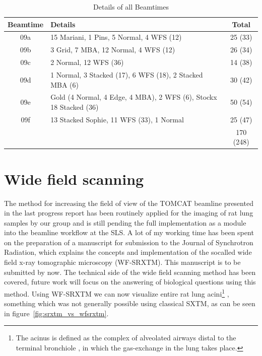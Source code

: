 \documentclass[a4paper,twoside,english,DIV=calc]{scrartcl}
\begin{document}
\begin{table}[htp]
\centering
\scriptsize
\begin{tabular}{clc}
\toprule
Beamtime & Details & Total\\
\midrule
09a & 15 Mariani, 1 Pins, 5 Normal, 4 WFS (12) & 25 (33)\\
09b & 3 Grid, 7 MBA, 12 Normal, 4 WFS (12) & 26 (34)\\
09c & 2 Normal, 12 WFS (36) & 14 (38)\\
09d & 1 Normal, 3 Stacked (17), 6 WFS (18), 2 Stacked MBA (6) & 30 (42)\\
09e & Gold (4 Normal, 4 Edge, 4 MBA), 2 WFS (6), Stockx 18 Stacked (36) & 50 (54)\\
09f & 13 Stacked Sophie, 11 WFS (33), 1 Normal & 25 (47)\\
\cmidrule(lr){3-3}
& & 170 (248)\\
\bottomrule
\end{tabular}
\normalsize
\caption{Details of all Beamtimes}
\label{tab:srxtm}
\end{table}

\section{Wide field scanning}
The method for increasing the field of view of the TOMCAT beamline presented in the last progress report has been routinely applied for the imaging of rat lung samples by our group and is still pending the full implementation as a module into the beamline workflow at the SLS. A lot of my working time has been spent on the preparation of a manuscript for submission to the Journal of Synchrotron Radiation, which explains the concepts and implementation of the socalled wide field x-ray tomographic microscopy (WF-SRXTM). This manuscript is to be submitted by now. The technical side of the wide field scanning method has been covered, future work will focus on the answering of biological questions using this method. Using WF-SRXTM we can now visualize entire rat lung acini\footnote{The acinus is defined as the complex of alveolated airways distal to the terminal bronchiole \cite{Rodriguez1987}, in which the gas-exchange in the lung takes place.} , something which was not generally possible using classical SXTM, as can be seen in figure~\ref{fig:srxtm_vs_wfsrxtm}.
\end{document}
